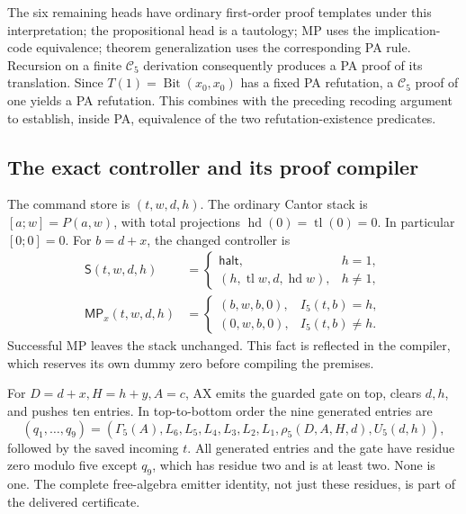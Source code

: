 The six remaining heads have ordinary first-order proof templates under
this interpretation; the propositional head is a tautology; MP uses the
implication-code equivalence; theorem generalization uses the corresponding
PA rule. Recursion on a finite $\mathcal C_5$ derivation consequently
produces a PA proof of its translation. Since
$T(1)=\operatorname{Bit}(x_0,x_0)$ has a fixed PA refutation, a
$\mathcal C_5$ proof of one yields a PA refutation. This combines with the
preceding recoding argument to establish, inside PA, equivalence of the two
refutation-existence predicates.

\subsection{The exact controller and its proof compiler}

The command store is $(t,w,d,h)$. The ordinary Cantor stack is
$[a;w]=P(a,w)$, with total projections
$\operatorname{hd}(0)=\operatorname{tl}(0)=0$. In particular $[0;0]=0$.
For $b=d+x$, the changed controller is
\[
\begin{aligned}
 \mathsf S(t,w,d,h)&=
  \begin{cases}\mathsf{halt},&h=1,\\
    (h,\operatorname{tl}w,d,\operatorname{hd}w),&h\ne1,
  \end{cases}\\
 \mathsf{MP}_x(t,w,d,h)&=
  \begin{cases}(b,w,b,0),&I_5(t,b)=h,\\
                 (0,w,b,0),&I_5(t,b)\ne h.
  \end{cases}
\end{aligned}
\]
Successful MP leaves the stack unchanged. This fact is reflected in the
compiler, which reserves its own dummy zero before compiling the premises.

For $D=d+x,H=h+y,A=c$, AX emits the guarded gate on top, clears $d,h$,
and pushes ten entries. In top-to-bottom order the nine generated entries
are
\[
 (q_1,\ldots,q_9)=(\Gamma_5(A),L_6,L_5,L_4,L_3,L_2,L_1,
                          \rho_5(D,A,H,d),U_5(d,h)),
\]
followed by the saved incoming $t$. All generated entries and the gate
have residue zero modulo five except $q_9$, which has residue two and is
at least two. None is one. The complete free-algebra emitter identity,
not just these residues, is part of the delivered certificate.

